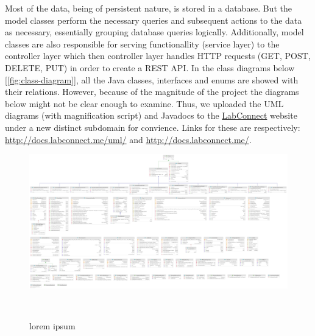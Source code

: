 \documentclass[a4paper, 12pt]{article}
\begin{document}
    Most of the data, being of persistent nature, is stored in a database. But the model classes
    perform the necessary queries and subsequent actions to the data as necessary,
    essentially grouping database queries logically. Additionally, model classes are also responsible for serving
    functionallity (service layer) to the controller layer which then controller layer handles HTTP requests (GET, POST, DELETE, PUT) in order
    to create a REST API. In the class diagrams below [\ref{fig:class-diagram}], all the Java classes,
    interfaces and enums are showed with their relations. However, because of the magnitude of the project
    the diagrams below might not be clear enough to examine. Thus, we uploaded the UML diagrams
    (with magnification script) and Javadocs to the \href{http://www.labconnect.me}{LabConnect} website under a new distinct subdomain for convience.
    Links for these are respectively: \href{http://docs.labconnect.me/uml/}{http://docs.labconnect.me/uml/}
    and \href{http://docs.labconnect.me/}{http://docs.labconnect.me/}.

    \begin{figure}[H]
        \centering
        \includegraphics[width=\textwidth]{uml-straight.png}
        \caption{lorem ipsum}~\label{fig:straight-class-diagram}
    \end{figure}
\end{document}
